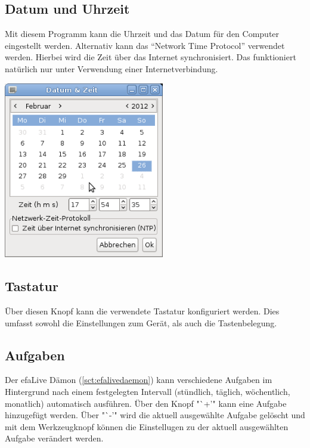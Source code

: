 \documentclass[a4paper,12pt,twoside]{article}
\begin{document}
\subsection{Datum und Uhrzeit}
\label{sct:datetime}
Mit diesem Programm kann die Uhrzeit und das Datum für den Computer
eingestellt werden. Alternativ kann das "`Network Time
Protocol"' verwendet werden. Hierbei wird die Zeit über
das Internet synchronisiert. Das funktioniert natürlich nur unter
Verwendung einer Internetverbindung.

\bigskip
\begin{minipage}{\linewidth}
    \centering
    \captionsetup{type=figure}
    \includegraphics[width=7cm]{screenshots/efaLivede-img25.png}
    \label{fig:datetime}
\end{minipage}
\bigskip

\subsection{Tastatur}
\label{sct:tastatur}
Über diesen Knopf kann die verwendete Tastatur konfiguriert werden. Dies
umfasst sowohl die Einstellungen zum Gerät, als auch die
Tastenbelegung.


\subsection{Aufgaben}
\label{sct:efalivesetup_tasks}

Der efaLive Dämon (\ref{sct:efalivedaemon}) kann verschiedene Aufgaben im
Hintergrund nach einem festgelegten Intervall (stündlich, täglich, 
wöchentlich, monatlich) automatisch ausführen. Über den
Knopf "`+'" kann eine Aufgabe hinzugefügt werden. Über "`-'" wird die aktuell 
ausgewählte Aufgabe gelöscht und mit dem Werkzeugknopf können die Einstellugen
zu der aktuell ausgewählten Aufgabe verändert werden.
\end{document}
